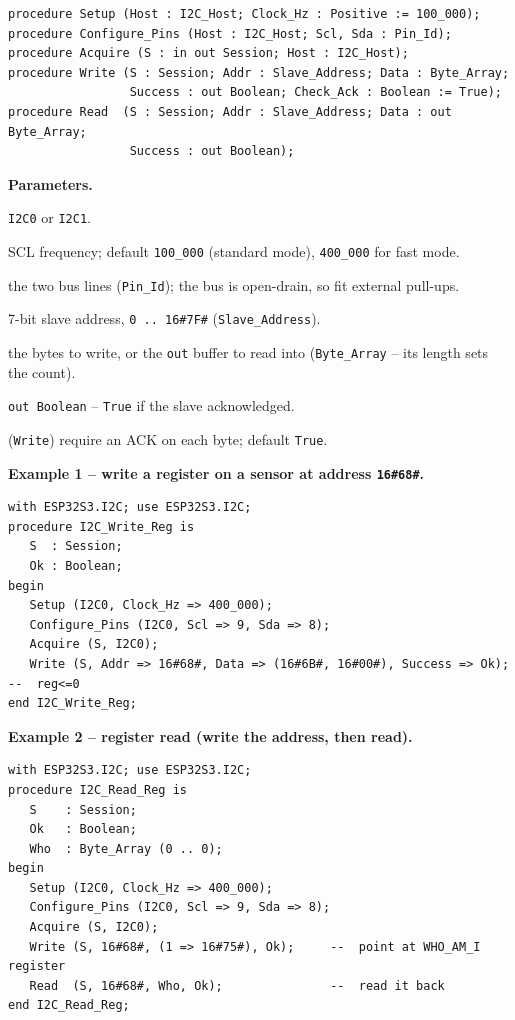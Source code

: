 \begin{lstlisting}
procedure Setup (Host : I2C_Host; Clock_Hz : Positive := 100_000);
procedure Configure_Pins (Host : I2C_Host; Scl, Sda : Pin_Id);
procedure Acquire (S : in out Session; Host : I2C_Host);
procedure Write (S : Session; Addr : Slave_Address; Data : Byte_Array;
                 Success : out Boolean; Check_Ack : Boolean := True);
procedure Read  (S : Session; Addr : Slave_Address; Data : out Byte_Array;
                 Success : out Boolean);
\end{lstlisting}

\textbf{Parameters.}
\begin{description}[style=nextline]
\item[\texttt{Host}] \texttt{I2C0} or \texttt{I2C1}.
\item[\texttt{Clock\_Hz}] SCL frequency; default \texttt{100\_000} (standard mode),
  \texttt{400\_000} for fast mode.
\item[\texttt{Scl}, \texttt{Sda}] the two bus lines (\texttt{Pin\_Id}); the bus is
  open-drain, so fit external pull-ups.
\item[\texttt{Addr}] 7-bit slave address, \texttt{0\,..\,16\#7F\#}
  (\texttt{Slave\_Address}).
\item[\texttt{Data}] the bytes to write, or the \texttt{out} buffer to read into
  (\texttt{Byte\_Array} -- its length sets the count).
\item[\texttt{Success}] \texttt{out Boolean} -- \texttt{True} if the slave
  acknowledged.
\item[\texttt{Check\_Ack}] (\texttt{Write}) require an ACK on each byte; default
  \texttt{True}.
\end{description}

\textbf{Example 1 -- write a register on a sensor at address \texttt{16\#68\#}.}
\begin{lstlisting}
with ESP32S3.I2C; use ESP32S3.I2C;
procedure I2C_Write_Reg is
   S  : Session;
   Ok : Boolean;
begin
   Setup (I2C0, Clock_Hz => 400_000);
   Configure_Pins (I2C0, Scl => 9, Sda => 8);
   Acquire (S, I2C0);
   Write (S, Addr => 16#68#, Data => (16#6B#, 16#00#), Success => Ok);  --  reg<=0
end I2C_Write_Reg;
\end{lstlisting}

\textbf{Example 2 -- register read (write the address, then read).}
\begin{lstlisting}
with ESP32S3.I2C; use ESP32S3.I2C;
procedure I2C_Read_Reg is
   S    : Session;
   Ok   : Boolean;
   Who  : Byte_Array (0 .. 0);
begin
   Setup (I2C0, Clock_Hz => 400_000);
   Configure_Pins (I2C0, Scl => 9, Sda => 8);
   Acquire (S, I2C0);
   Write (S, 16#68#, (1 => 16#75#), Ok);     --  point at WHO_AM_I register
   Read  (S, 16#68#, Who, Ok);               --  read it back
end I2C_Read_Reg;
\end{lstlisting}

